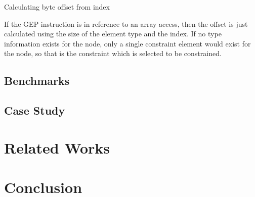 \documentclass[11pt,a4paper]{article}
\begin{document}
\begin{algorithm}
  \caption{Calculating byte offset from index}
  \label{alg:find_offset}
  
\end{algorithm}

If the GEP instruction is in reference to an array access, then the offset is
just calculated using the size of the element type and the index. If no type
information exists for the node, only a single constraint element would exist
for the node, so that is the constraint which is selected to be constrained. 

\subsection{Benchmarks}

\subsection{Case Study}

\section{Related Works}

\section{Conclusion}

{}

\end{document}
